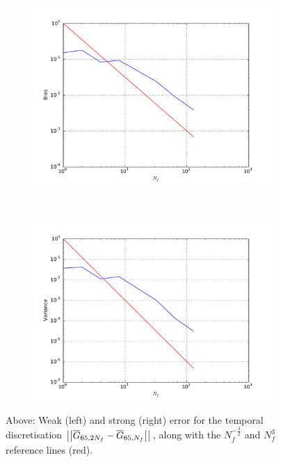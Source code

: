 \documentclass[11pt]{amsart}
\begin{document}
\begin{figure}
    \centering
    \begin{subfigure}[b]{0.4\textwidth}
        \includegraphics[width=\textwidth]{weakerr4.pdf}
    \end{subfigure}
    ~ %
    \begin{subfigure}[b]{0.4\textwidth}
        \includegraphics[width=\textwidth]{strongerr4.pdf}
    \end{subfigure}
    \caption{\label{img:rateFig3} Above: Weak (left) and strong (right) error
    for the temporal discretisation
    $\left| {\left| {{\overline G_{65,2N_f}-\overline G_{65,N_f}}} \right|} \right|_{}$,
    along with the $N_f^{-\frac{3}{2}}$ and $N_f^{3}$ reference lines (red).}
\end{figure}
\end{document}
